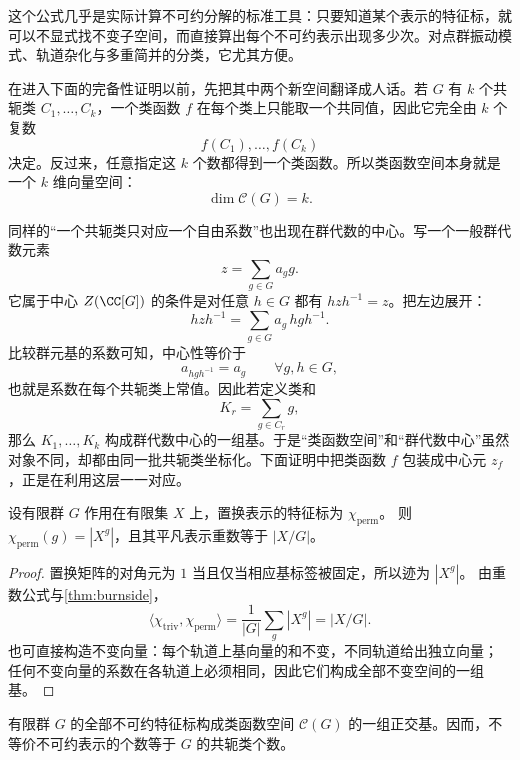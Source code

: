 这个公式几乎是实际计算不可约分解的标准工具：只要知道某个表示的特征标，就可以不显式找不变子空间，而直接算出每个不可约表示出现多少次。对点群振动模式、轨道杂化与多重简并的分类，它尤其方便。

在进入下面的完备性证明以前，先把其中两个新空间翻译成人话。若 $G$ 有 $k$ 个共轭类 $C_1,\dots,C_k$，一个类函数 $f$ 在每个类上只能取一个共同值，因此它完全由 $k$ 个复数
\[
f(C_1),\dots,f(C_k)
\]
决定。反过来，任意指定这 $k$ 个数都得到一个类函数。所以类函数空间本身就是一个 $k$ 维向量空间：
\[
\dim\mathcal C(G)=k.
\]

同样的“一个共轭类只对应一个自由系数”也出现在群代数的中心。写一个一般群代数元素
\[
z=\sum_{g\in G}a_g g.
\]
它属于中心 $Z(\CC[G])$ 的条件是对任意 $h\in G$ 都有 $hzh^{-1}=z$。把左边展开：
\[
hzh^{-1}=\sum_{g\in G}a_g\,hgh^{-1}.
\]
比较群元基的系数可知，中心性等价于
\[
a_{hgh^{-1}}=a_g
\qquad\forall g,h\in G,
\]
也就是系数在每个共轭类上常值。因此若定义类和
\[
K_r=\sum_{g\in C_r}g,
\]
那么 $K_1,\dots,K_k$ 构成群代数中心的一组基。于是“类函数空间”和“群代数中心”虽然对象不同，却都由同一批共轭类坐标化。下面证明中把类函数 $f$ 包装成中心元 $z_f$，正是在利用这层一一对应。

\begin{proposition}[置换特征标与轨道数]
设有限群 $G$ 作用在有限集 $X$ 上，置换表示的特征标为 $\chi_{\mathrm{perm}}$。
则 $\chi_{\mathrm{perm}}(g)=|X^g|$，且其平凡表示重数等于 $|X/G|$。
\end{proposition}

\begin{proof}
置换矩阵的对角元为 $1$ 当且仅当相应基标签被固定，所以迹为 $|X^g|$。
由重数公式与\cref{thm:burnside}，
\[
\langle\chi_{\mathrm{triv}},\chi_{\mathrm{perm}}\rangle
=\frac1{|G|}\sum_g|X^g|=|X/G|.
\]
也可直接构造不变向量：每个轨道上基向量的和不变，不同轨道给出独立向量；
任何不变向量的系数在各轨道上必须相同，因此它们构成全部不变空间的一组基。
\end{proof}

\begin{theorem}[不可约特征标构成类函数空间的一组正交基]
有限群 $G$ 的全部不可约特征标构成类函数空间 $\mathcal C(G)$ 的一组正交基。因而，不等价不可约表示的个数等于 $G$ 的共轭类个数。
\label{thm:character-basis}

\end{theorem}

